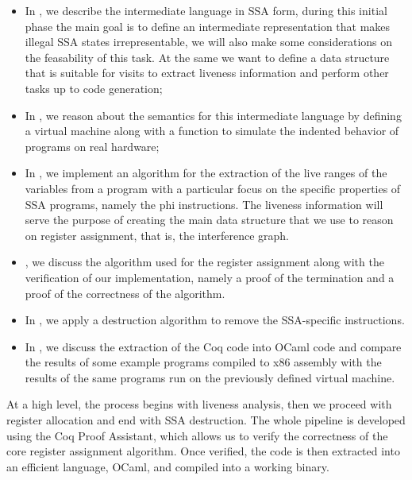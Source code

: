 \begin{itemize}
\item In , we describe the intermediate language in SSA form, during this initial phase the main goal is to define an intermediate representation that makes illegal SSA states irrepresentable, we will also make some considerations on the feasability of this task. At the same we want to define a data structure that is suitable for visits to extract liveness information and perform other tasks up to code generation;

\item In , we reason about the semantics for this intermediate language by defining a virtual machine along with a function to simulate the indented behavior of programs on real hardware;

\item In , we implement an algorithm for the extraction of the live ranges of the variables from a program with a particular focus on the specific properties of SSA programs, namely the phi instructions. The liveness information will serve the purpose of creating the main data structure that we use to reason on register assignment, that is, the interference graph.

\item {}, we discuss the algorithm used for the register assignment along with the verification of our implementation, namely a proof of the termination and {\color{red} a proof of the correctness of the algorithm}.

\item In , we apply a destruction algorithm to remove the SSA-specific instructions.

\item In , we discuss the extraction of the Coq code into OCaml code and compare the results of some example programs compiled to x86 assembly with the results of the same programs run on the previously defined virtual machine.
\end{itemize}

At a high level, the process begins with liveness analysis, then we proceed with register allocation and end with SSA destruction. The whole pipeline is developed using the Coq Proof Assistant, which allows us to verify the correctness of the core register assignment algorithm. Once verified, the code is then extracted into an efficient language, OCaml, and compiled into a working binary.